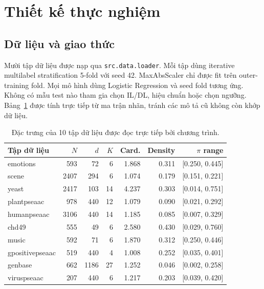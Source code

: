 \documentclass[11pt,a4paper,twoside]{article}
\begin{document}
\section{Thiết kế thực nghiệm}
\subsection{Dữ liệu và giao thức}
Mười tập dữ liệu được nạp qua \texttt{src.data.loader}. Mỗi tập dùng iterative multilabel stratification 5-fold với seed 42. MaxAbsScaler chỉ được fit trên outer-training fold. Mọi mô hình dùng Logistic Regression và seed fold tương ứng. Không có mẫu test nào tham gia chọn IL/DL, hiệu chuẩn hoặc chọn ngưỡng. Bảng~\ref{tab:datasets} được tính trực tiếp từ ma trận nhãn, tránh các mô tả cũ không còn khớp dữ liệu.
\begin{table}[H]
\centering
\caption{Đặc trưng của 10 tập dữ liệu được đọc trực tiếp bởi chương trình.}
\label{tab:datasets}
\small
\begin{tabular}{lrrrrrr}
\toprule
Tập dữ liệu & $N$ & $d$ & $K$ & Card. & Density & $\pi$ range \\
\midrule
emotions & 593 & 72 & 6 & 1.868 & 0.311 & [0.250, 0.445] \\
scene & 2407 & 294 & 6 & 1.074 & 0.179 & [0.151, 0.221] \\
yeast & 2417 & 103 & 14 & 4.237 & 0.303 & [0.014, 0.751] \\
plantpseaac & 978 & 440 & 12 & 1.079 & 0.090 & [0.021, 0.292] \\
humanpseaac & 3106 & 440 & 14 & 1.185 & 0.085 & [0.007, 0.329] \\
chd49 & 555 & 49 & 6 & 2.580 & 0.430 & [0.029, 0.760] \\
music & 592 & 71 & 6 & 1.870 & 0.312 & [0.250, 0.446] \\
gpositivepseaac & 519 & 440 & 4 & 1.008 & 0.252 & [0.035, 0.401] \\
genbase & 662 & 1186 & 27 & 1.252 & 0.046 & [0.002, 0.258] \\
viruspseaac & 207 & 440 & 6 & 1.217 & 0.203 & [0.039, 0.420] \\
\bottomrule
\end{tabular}
\end{table}
\end{document}

